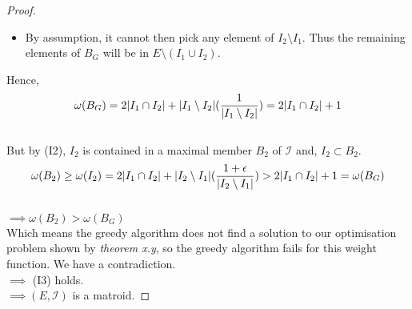 \documentclass[../main.tex]{subfiles}
\begin{document}
\begin{proof}
\begin{itemize}
\item By assumption, it cannot then pick any element of $I_2 \setminus I_1.$ Thus the remaining elements of $B_G$ will be in $E \setminus (I_1 \cup I_2).$\\
\end{itemize}
Hence,\[
\omega(B_G) = 2|I_1 \cap I_2| + |I_1 \setminus I_2|(\frac{1}{|I_1 \setminus I_2|})\\
= 2|I_1 \cap I_2| + 1
\]\\
But by (I2), $I_2$ is contained in a maximal member $B_2$ of $\mathcal{I}$ and, $I_2 \subset B_2.$\\
\[
\omega(B_2) \geq \omega(I_2) = 2|I_1 \cap I_2| + |I_2 \setminus I_1|(\frac{1+\epsilon}{|I_2 \setminus I_1|})\\
> 2|I_1 \cap I_2| + 1 = \omega(B_G)
\]\\
$\implies \omega(B_2) > \omega(B_G)$\\
Which means the greedy algorithm does not find a solution to our optimisation problem shown by \textit{theorem x.y}, so the greedy algorithm fails for this weight function. We have a contradiction.\\
$\implies$ (I3) holds.\\
$\implies (E,\mathcal{I})$ is a matroid.
\end{proof}
\end{document}
